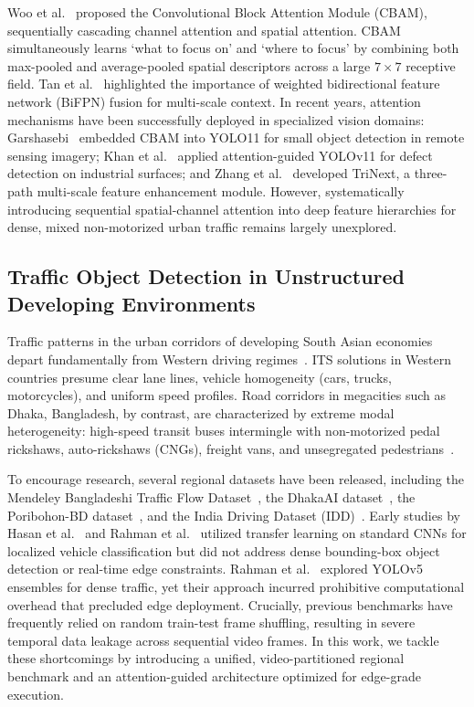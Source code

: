 \documentclass[pdflatex,sn-mathphys]{sn-jnl}
\begin{document}
Woo et al.~\cite{woo2018cbam} proposed the Convolutional Block Attention Module (CBAM), sequentially cascading channel attention and spatial attention. CBAM simultaneously learns `what to focus on' and `where to focus' by combining both max-pooled and average-pooled spatial descriptors across a large $7\times 7$ receptive field. Tan et al.~\cite{tan2020efficientdet} highlighted the importance of weighted bidirectional feature network (BiFPN) fusion for multi-scale context. In recent years, attention mechanisms have been successfully deployed in specialized vision domains: Garshasebi~\cite{garshasebi2025improving} embedded CBAM into YOLO11 for small object detection in remote sensing imagery; Khan et al.~\cite{khan2025defect} applied attention-guided YOLOv11 for defect detection on industrial surfaces; and Zhang et al.~\cite{zhang2025trinext} developed TriNext, a three-path multi-scale feature enhancement module. However, systematically introducing sequential spatial-channel attention into deep feature hierarchies for dense, mixed non-motorized urban traffic remains largely unexplored.

\subsection{Traffic Object Detection in Unstructured Developing Environments}
Traffic patterns in the urban corridors of developing South Asian economies depart fundamentally from Western driving regimes~\cite{hasan2021bangladeshi,rahman2022fine,varma2019idd}. ITS solutions in Western countries presume clear lane lines, vehicle homogeneity (cars, trucks, motorcycles), and uniform speed profiles. Road corridors in megacities such as Dhaka, Bangladesh, by contrast, are characterized by extreme modal heterogeneity: high-speed transit buses intermingle with non-motorized pedal rickshaws, auto-rickshaws (CNGs), freight vans, and unsegregated pedestrians~\cite{hossain2024visual,rahman2021densely}.

To encourage research, several regional datasets have been released, including the Mendeley Bangladeshi Traffic Flow Dataset~\cite{islam2025bangladeshi}, the DhakaAI dataset~\cite{shihavuddin2020dhakaai}, the Poribohon-BD dataset~\cite{sujoy2024monocular}, and the India Driving Dataset (IDD)~\cite{varma2019idd}. Early studies by Hasan et al.~\cite{hasan2021bangladeshi} and Rahman et al.~\cite{rahman2022fine} utilized transfer learning on standard CNNs for localized vehicle classification but did not address dense bounding-box object detection or real-time edge constraints. Rahman et al.~\cite{rahman2021densely} explored YOLOv5 ensembles for dense traffic, yet their approach incurred prohibitive computational overhead that precluded edge deployment. Crucially, previous benchmarks have frequently relied on random train-test frame shuffling, resulting in severe temporal data leakage across sequential video frames. In this work, we tackle these shortcomings by introducing a unified, video-partitioned regional benchmark and an attention-guided architecture optimized for edge-grade execution.
\end{document}
